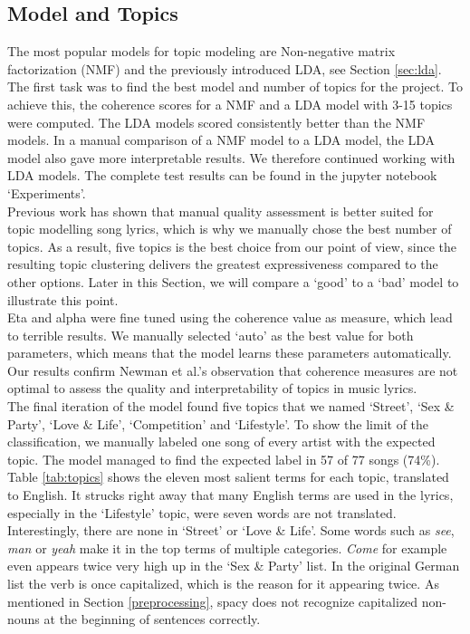 \documentclass[conference]{IEEEtran}
\begin{document}
\subsection{Model and Topics}
The most popular models for topic modeling are Non-negative matrix factorization (NMF) and the previously introduced LDA, see Section \ref{sec:lda}. The first task was to find the best model and number of topics for the project. To achieve this, the coherence scores for a NMF and a LDA model with 3-15 topics were computed. The LDA models scored consistently better than the NMF models. In a manual comparison of a NMF model to a LDA model, the LDA model also gave more interpretable results. We therefore continued working with LDA models. The complete test results can be found in the jupyter notebook {\lq}Experiments{\rq}.\\
Previous work has shown \cite{evaluation} that manual quality assessment is better suited for topic modelling song lyrics, which is why we manually chose the best number of topics. As a result, five topics is the best choice from our point of view, since the resulting topic clustering delivers the greatest expressiveness compared to the other options. Later in this Section, we will compare a {\lq}good{\rq} to a {\lq}bad{\rq} model to illustrate this point.\\
Eta and alpha were fine tuned using the coherence value as measure, which lead to terrible results. We manually selected {\lq}auto{\rq} as the best value for both parameters, which means that the model learns these parameters automatically. Our results confirm Newman et al.'s observation \cite{evaluation} that coherence measures are not optimal to assess the quality and interpretability of topics in music lyrics.\\
The final iteration of the model found five topics that we named {\lq}Street{\rq}, {\lq}Sex \& Party{\rq}, {\lq}Love \& Life{\rq}, {\lq}Competition{\rq} and {\lq}Lifestyle{\rq}. To show the limit of the classification, we manually labeled one song of every artist with the expected topic. The model managed to find the expected label in 57 of 77 songs (74\%). Table \ref{tab:topics} shows the eleven most salient terms for each topic, translated to English. It strucks right away that many English terms are used in the lyrics, especially in the {\lq}Lifestyle{\rq} topic, were seven words are not translated. Interestingly, there are none in {\lq}Street{\rq} or {\lq}Love \& Life{\rq}. Some words such as \textit{see}, \textit{man} or \textit{yeah} make it in the top terms of multiple categories. \textit{Come} for example even appears twice very high up in the {\lq}Sex \& Party{\rq} list. In the original German list the verb is once capitalized, which is the reason for it appearing twice. As mentioned in Section \ref{preprocessing}, spacy does not recognize capitalized non-nouns at the beginning of sentences correctly.
\end{document}
